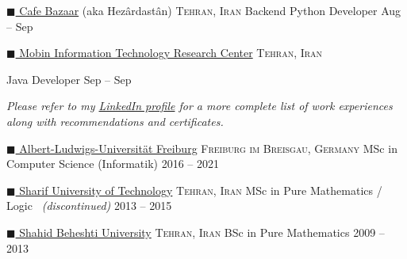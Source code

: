 \documentclass[10pt,a4paper]{article}
\newcommand{\colorsquare}[1]{\textcolor{#1}{$\blacksquare$}}
\begin{document}
\headedsection  %
  {\href{https://en.wikipedia.org/wiki/Cafe_Bazaar}{\colorsquare{bazaar} Cafe Bazaar} (aka Hezârdastân)}
  {\textsc{Tehran, Iran}} {%
  \headedsubsection
    {Backend Python Developer}
    {Aug  -- Sep }
    {}
}

\headedsection
  {\href{http://mitrc.ir}{\colorsquare{camouflagegreen} Mobin Information Technology Research Center}}
  {\textsc{Tehran, Iran}} {%

  \headedsubsection
    {Java Developer}
    {Sep  -- Sep }
    {}
}

\vspace{-0.2em}
\begin{center}
  \emph{\small Please refer to my \href{http://www.linkedin.com/in/aerabi}{LinkedIn profile} for a more complete list of work experiences along with recommendations and certificates.}
\end{center}

\spacedhrule{-0.2em}{-0.4em}


\headedsection
  {\href{http://www.uni-freiburg.de/}{\colorsquare{carolinablue} Albert-Ludwigs-Universität Freiburg}}
  {\textsc{Freiburg im Breisgau, Germany}} {%
  \headedsubsection
    {MSc in Computer Science (Informatik)}
    {2016 -- 2021}
    {}
}

\headedsection
  {\href{http://www.en.sharif.edu/}{\colorsquare{amethyst} Sharif University of Technology}}
  {\textsc{Tehran, Iran}} {%
  \headedsubsection
    {MSc in Pure Mathematics / Logic \textnormal{\textit{~(discontinued)}}}
    {2013 -- 2015} 
    {}
}

\headedsection
  {\href{http://en.sbu.ac.ir/}{\colorsquare{brickred} Shahid Beheshti University}}
  {\textsc{Tehran, Iran}} {%
  \headedsubsection
    {BSc in Pure Mathematics}
    {2009 -- 2013} 
    {
    }
}
\end{document}
